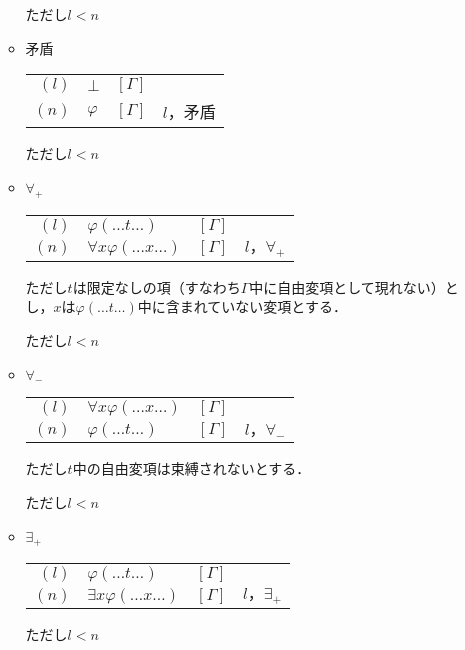 \documentclass[10pt,b5paper,papersize,dvipdfmx]{jsbook}
\begin{document}
\begin{itemize}
\begin{itemize}
\begin{table}[H]
\begin{center}
\begin{tabular}{rlrl}
\end{tabular}
\end{center}
\end{table}
ただし$l<n$
\item 矛盾
\begin{table}[H]
\begin{center}
\begin{tabular}{rlrl}
$(l)$&$\bot$&$[\Gamma]$& \\
$(n)$&$\varphi$&$[\Gamma]$&$l，$矛盾
\end{tabular}
\end{center}
\end{table}
ただし$l<n$
\item $\forall_+$
\begin{table}[H]
\begin{center}
\begin{tabular}{rlrl}
$(l)$&$\varphi(\dots t \dots)$&$[\Gamma]$& \\
$(n)$&$\forall x \varphi(\dots x \dots)$&$[\Gamma]$&$l，\forall_+$
\end{tabular}
\end{center}
\end{table}
ただし$t$は限定なしの項（すなわち$\Gamma$中に自由変項として現れない）とし，$x$は$\varphi(\dots t \dots)$中に含まれていない変項とする． \par
ただし$l<n$
\item $\forall_-$
\begin{table}[H]
\begin{center}
\begin{tabular}{rlrl}
$(l)$&$\forall x\varphi(\dots x \dots)$&$[\Gamma]$& \\
$(n)$&$\varphi(\dots t \dots)$&$[\Gamma]$&$l，\forall_-$
\end{tabular}
\end{center}
\end{table}
ただし$t$中の自由変項は束縛されないとする．\par
ただし$l<n$
\item $\exists_+$
\begin{table}[H]
\begin{center}
\begin{tabular}{rlrl}
$(l)$&$\varphi(\dots t \dots)$&$[\Gamma]$& \\
$(n)$&$\exists x\varphi(\dots x \dots)$&$[\Gamma]$&$l，\exists_+$
\end{tabular}
\end{center}
\end{table}
ただし$l<n$

\end{itemize}
\end{itemize}
\end{document}

